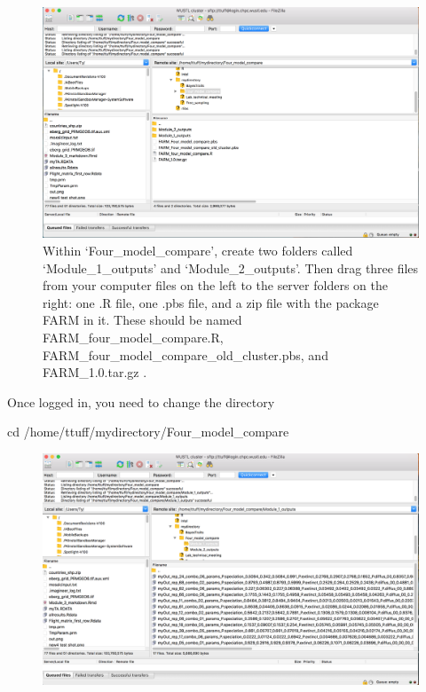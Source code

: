 \documentclass[]{book}
\newenvironment{Shaded}{\begin{snugshade}}{\end{snugshade}}
\newcommand{\BuiltInTok}[1]{{#1}}
\newcommand{\NormalTok}[1]{{#1}}
\theoremstyle{definition}
\theoremstyle{definition}
\theoremstyle{remark}
\begin{document}
\begin{figure}
\centering
\includegraphics{Create module folders.png}
\caption{Within `Four\_model\_compare', create two folders called
`Module\_1\_outputs' and `Module\_2\_outputs'. Then drag three files
from your computer files on the left to the server folders on the right:
one .R file, one .pbs file, and a zip file with the package FARM in it.
These should be named FARM\_four\_model\_compare.R,
FARM\_four\_model\_compare\_old\_cluster.pbs, and FARM\_1.0.tar.gz .}
\end{figure}

Once logged in, you need to change the directory

\begin{Shaded}
\begin{Highlighting}[]
\BuiltInTok{cd}\NormalTok{ /home/ttuff/mydirectory/Four_model_compare}
\end{Highlighting}
\end{Shaded}

\begin{figure}
\centering
\includegraphics{Files from module 1.png}
\caption{}
\end{figure}
\end{document}
